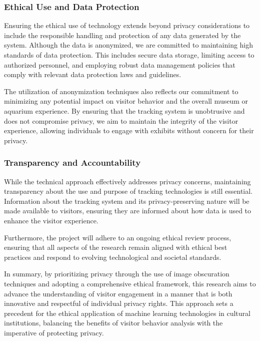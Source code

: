 \subsubsection{Ethical Use and Data Protection}
Ensuring the ethical use of technology extends beyond privacy considerations to include the responsible handling and protection of any data generated by the system. Although the data is anonymized, we are committed to maintaining high standards of data protection. This includes secure data storage, limiting access to authorized personnel, and employing robust data management policies that comply with relevant data protection laws and guidelines.

The utilization of anonymization techniques also reflects our commitment to minimizing any potential impact on visitor behavior and the overall museum or aquarium experience. By ensuring that the tracking system is unobtrusive and does not compromise privacy, we aim to maintain the integrity of the visitor experience, allowing individuals to engage with exhibits without concern for their privacy.

\subsubsection{Transparency and Accountability}
While the technical approach effectively addresses privacy concerns, maintaining transparency about the use and purpose of tracking technologies is still essential. Information about the tracking system and its privacy-preserving nature will be made available to visitors, ensuring they are informed about how data is used to enhance the visitor experience.

Furthermore, the project will adhere to an ongoing ethical review process, ensuring that all aspects of the research remain aligned with ethical best practices and respond to evolving technological and societal standards.

In summary, by prioritizing privacy through the use of image obscuration techniques and adopting a comprehensive ethical framework, this research aims to advance the understanding of visitor engagement in a manner that is both innovative and respectful of individual privacy rights. This approach sets a precedent for the ethical application of machine learning technologies in cultural institutions, balancing the benefits of visitor behavior analysis with the imperative of protecting privacy.



